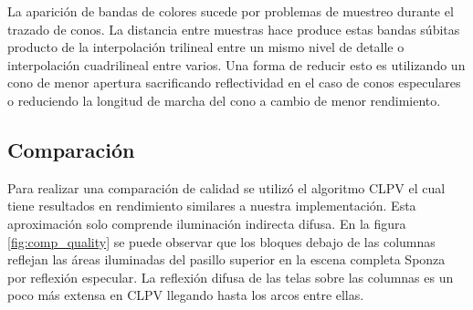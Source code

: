 La aparición de bandas de colores sucede por problemas de muestreo durante el trazado de conos. La distancia entre muestras hace produce estas bandas súbitas producto de la interpolación trilineal entre un mismo nivel de detalle o interpolación cuadrilineal entre varios. Una forma de reducir esto es utilizando un cono de menor apertura sacrificando reflectividad en el caso de conos especulares o reduciendo la longitud de marcha del cono a cambio de menor rendimiento.

\subsection{Comparación} %
Para realizar una comparación de calidad se utilizó el algoritmo \ac{CLPV} el cual tiene resultados en rendimiento similares a nuestra implementación. Esta aproximación solo comprende iluminación indirecta difusa. En la figura \ref{fig:comp_quality} se puede observar que los bloques debajo de las columnas reflejan las áreas iluminadas del pasillo superior en la escena completa Sponza por reflexión especular. La reflexión difusa de las telas sobre las columnas es un poco más extensa en \ac{CLPV} llegando hasta los arcos entre ellas.
\label{sub:comparacion}
